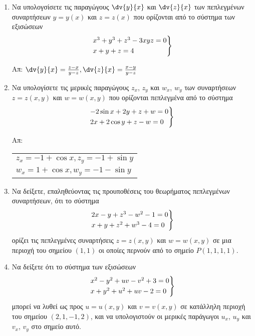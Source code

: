 \begin{enumerate}


    \item Να υπολογσίσετε τις παραγώγους $ \dv{y}{x} $ και $ \dv{z}{x}$ των πεπλεγμένων 
        συναρτήσεων $ y=y(x) $ και $ z=z(x) $ που ορίζονται από το σύστημα των εξισώσεων
        \[
            \begin{rcases}
                x^{3} + y^{3} + z^{3} -3xyz = 0 \\
                x+y+z=4 
            \end{rcases}
        \]

        \hfill Απ: $ \dv{y}{x} = \frac{ z-x }{ y-z }, \dv{z}{x} = \frac{ x-y }{ y-z } $ 

    \item Να υπολογίσετε τις μερικές παραγώγους $ z_{x}$, $ z_{y} $ και $ w_{x} $, 
        $ w_{y} $ των συναρτήσεων $ z = z(x,y) $ και $ w = w(x,y) $ που ορίζονται 
        πεπλεγμένα από το σύστημα 
        \[
            \begin{rcases}
                -2 \sin{x} + 2y + z + w = 0  \\
                2x + 2 \cos{y} + z - w = 0 
            \end{rcases} 
        \]

        \hfill Απ: \begin{tabular}{l}
            $ z_{x} = -1 + \cos{x}, z_{y} = -1 + \sin{y} $ \\
            $ w_{x} = 1 + \cos{x}, w_{y} = -1 - \sin{y}  $ 
        \end{tabular}

    \item Να δείξετε, επαληθεύοντας τις προυποθέσεις του θεωρήματος πεπλεγμένων
        συναρτήσεων, ότι το σύστημα 
        \[
            \begin{rcases}
                2x-y+z^{3}-w^{2}-1=0 \\
                x+y+z^{2}+w^{3}-4=0
            \end{rcases} 
        \]
        ορίζει τις πεπλεγμένες συναρτήσεις $ z = z(x,y) $ και $ w = w(x,y) $
        σε μια περιοχή του σημείου $ (1,1) $ οι οποίες περνούν από 
        το σημείο $ P(1,1,1,1) $.

    \item Να δείξετε ότι το σύστημα των εξισώσεων 
        \[
            \begin{rcases}
                x^{2}-y^{2}+uv-v^{2}+3 = 0 \\
                x+y^{2}+u^{2}+uv-2=0
            \end{rcases}
        \]
        μπορεί να λυθεί ως προς $ u = u(x,y) $ και $ v=v(x,y) $ σε κατάλληλη 
        περιοχή του σημείου $ (2,1,-1,2) $, και να υπολογιστούν οι μερικές παράγωγοι 
        $ u_{x} $, $ u_{y} $ και $ v_{x} $, $ v_{y} $ στο σημείο αυτό.


\end{enumerate}
